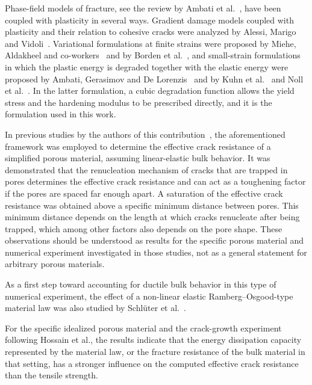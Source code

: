 \documentclass[pdflatex,sn-mathphys-num]{sn-jnl}%
\theoremstyle{thmstyleone}%
\theoremstyle{thmstyletwo}%
\theoremstyle{thmstylethree}%
\begin{document}
Phase-field models of fracture, see the review by Ambati et al.~\cite{ambati_review_2015}, have been coupled with plasticity in several ways. Gradient damage models coupled with plasticity and their relation to cohesive cracks were analyzed by Alessi, Marigo and Vidoli~\cite{alessi_gradient_2014}. Variational formulations at finite strains were proposed by Miehe, Aldakheel and co-workers~\cite{miehe_phasefield_ductile_2016,miehe_phasefield_porous_2016} and by Borden et al.~\cite{borden_phasefield_2016}, and small-strain formulations in which the plastic energy is degraded together with the elastic energy were proposed by Ambati, Gerasimov and De Lorenzis~\cite{ambati_ductile_2015} and by Kuhn et al.~\cite{kuhn_phase_2016} and Noll et al.~\cite{noll_3d_2020}. In the latter formulation, a cubic degradation function allows the yield stress and the hardening modulus to be prescribed directly, and it is the formulation used in this work.









In previous studies by the authors of this contribution~\cite{schlueter_ermittlung_2025,schluter_determination_2025},
the aforementioned framework was employed to determine the effective crack resistance of a simplified porous material,
assuming linear-elastic bulk behavior. It was demonstrated that
the renucleation mechanism of cracks that are trapped in pores
determines the effective crack resistance
and can act as a toughening factor if the pores are
spaced far enough apart. A saturation of the effective crack resistance was obtained above
a specific minimum distance between pores. This minimum distance depends on the
length at which cracks renucleate after being trapped, which among other factors also
depends on the pore shape.
These observations should be understood as results for the specific porous material and numerical experiment investigated in those studies, not as a general statement for arbitrary porous materials.

As a first step toward accounting for ductile bulk behavior in this type of numerical experiment,
the effect of a non-linear elastic Ramberg--Osgood-type material law was also studied by Schlüter et al.~\cite{schluter_influence_2025}.

For the specific idealized porous material and the crack-growth experiment following Hossain et al.,
the results indicate that the energy dissipation capacity represented by the material law,
or the fracture resistance of the bulk material in that setting,
has a stronger influence on the computed effective crack resistance than the tensile strength.
\end{document}
